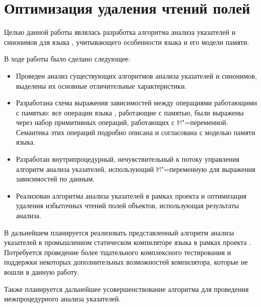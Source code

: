 \documentclass[14pt,titlepage,draft]{extarticle}
\newcommand{\java}{\eng{Java}\xspace}
\newcommand{\M}{\ensuremath{\mathbb{M}}}
\begin{document}

  \section{Оптимизация удаления чтений полей}






    Целью данной работы являлась разработка алгоритма анализа указателей и
    синонимов для языка \java, учитывающего особенности языка и его модели
    памяти.

    В ходе работы было сделано следующее:
    \begin{itemize}
      \item Проведен анализ существующих алгоритмов анализа указателей и
            синонимов, выделены их основные отличительные характеристики.
      \item Разработана схема выражения зависимостей между операциями
            работающими с памятью: все операции языка \java, работающие с
            памятью, были выражены через набор примитивных операций, работающих
            с \M"=переменной. Семантика этих операций подробно описана и
            согласована с моделью памяти языка.
      \item Разработан внутрипроцедурный, нечувствительный к потоку управления
            алгоритм анализа указателей, использующий \M"=переменную для
            выражения зависимостей по данным.
      \item Реализован алгоритма анализа указателей в рамках проекта
             и оптимизация удаления избыточных чтений полей
            объектов, использующая результаты анализа.
    \end{itemize}


    В дальнейшем планируется реализовать представленный алгоритм анализа
    указателей в промышленном статическом компиляторе языка \java в
    рамках проекта . Потребуется проведение более
    тщательного комплексного тестирования и поддержки некоторых дополнительных
    возможностей компилятора, которые не вошли в данную работу.

    Также планируется дальнейшее усовершенствование алгоритма для
    проведения межпроцедурного анализа указателей.


  \newpage
  
  
\end{document}
